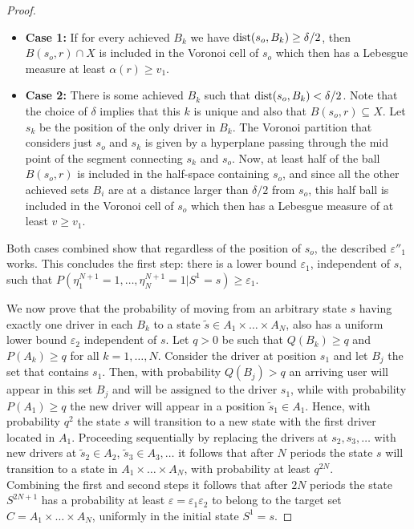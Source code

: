 \documentclass[12pt,english]{article}
\begin{document}
{\begin{proof}
\begin{itemize}
    \item \textbf{Case 1:} If for every achieved $B_k$ we have $\mathop{\rm dist}(s_o,B_k)\geq\delta/2$, then  $B(s_o,r)\cap X$ is included in the Voronoi cell of $s_o$ which then has  a Lebesgue measure  at least $\alpha(r)\geq v_1$.
     \vspace{-1ex}

    \item \textbf{Case 2:} There is some achieved $B_k$ such that $\mathop{\rm dist}(s_o,B_k)<\delta/2$. Note that the choice of $\delta$ implies that this $k$ is unique and also that 
    $B(s_o,r)
    \subseteq X$.
    Let $s_k$ be the position of the only driver in $B_k$.  The Voronoi partition that considers just  $s_o$ and $s_k$ is given by a hyperplane passing through the mid point of the segment connecting $s_k$ and $s_o$. Now, at least half of the ball 
    $B(s_o,r)$
    is included in the half-space containing $s_o$, and since all the other achieved sets $B_i$ are at a distance larger than $\delta/2$ from $s_o$, this half ball is  included in the Voronoi cell of $s_o$ which then has a Lebesgue measure  of at least $v\geq v_1$.
\end{itemize}
 \vspace{-2ex}

\noindent Both cases combined show that regardless of the position of $s_o$, the described $\varepsilon''_1$ works. This concludes the first step: there is a lower bound $\varepsilon_1$, independent of $s$, such that $P(\eta^{N+1}_1=1,\ldots,\eta^{N+1}_N=1|S^1=s)\geq\varepsilon_1$.


\vspace{1ex}
 We now prove that the probability of moving from an arbitrary state $s$  having exactly one driver in each $B_k$ to a state $\tilde s\in A_1\times\ldots\times A_N$, also has a uniform lower bound $\varepsilon_2$ independent of $s$. 
Let $q>0$ be such that $Q(B_k)\geq q$ and $P(A_k)\geq q$ for all $k=1,\ldots,N$. Consider the driver at position $s_1$ and let  $B_{j}$ the set that contains $s_1$. Then, with probability $Q(B_{j})>q$ an  arriving user will appear in this set $B_j$ and will be assigned to the driver $s_1$, while with probability $P(A_1)\geq q$ the new driver will appear in a position $\tilde s_1\in A_1$.
Hence, with probability $q^2$ the state $s$ will transition to a new state with the first driver located in $A_1$. Proceeding sequentially by replacing the drivers at $s_2,s_3,\ldots$ with new drivers at $\tilde s_2\in A_2$, $\tilde s_3\in A_3, \ldots$
it follows that  after $N$ periods the state $s$ will transition to a state in $A_1\times\ldots\times A_N$, with probability at least $q^{2N}$.
\\[2ex]
Combining the first and second steps it follows that after $2N$ periods the state $S^{2N+1}$ has a probability at least $\varepsilon=\varepsilon_1 \varepsilon_2$ to belong to the target set $C=A_1\times\ldots\times A_N$, uniformly in the initial state $S^1=s$.
\end{proof}

}
\end{document}
